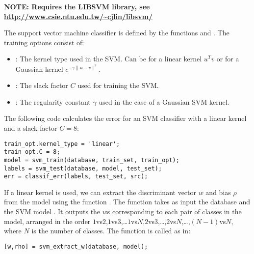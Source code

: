 \documentclass[twocolumn]{article}
\begin{document}
\textbf{NOTE: Requires the LIBSVM library, see \url{http://www.csie.ntu.edu.tw/~cjlin/libsvm/}}

The support vector machine classifier is defined by the functions  and . The training options consist of:
\begin{itemize}
	\item {}: The kernel type used in the SVM. Can be  for a linear kernel $u^Tv$ or  for a Gaussian kernel $e^{-\gamma\|u-v\|^2}$.
	\item {}: The slack factor $C$ used for training the SVM.
	\item {}: The regularity constant $\gamma$ used in the case of a Gaussian SVM kernel.
\end{itemize}

The following code calculates the error for an SVM classifier with a linear kernel and a slack factor $C = 8$:
\begin{lstlisting}
train_opt.kernel_type = 'linear';
train_opt.C = 8;
model = svm_train(database, train_set, train_opt);
labels = svm_test(database, model, test_set);
err = classif_err(labels, test_set, src);
\end{lstlisting}

If a linear kernel is used, we can extract the discriminant vector $w$ and bias $\rho$ from the model using the function . The function takes as input the database  and the SVM model . It outputs the $w$s corresponding to each pair of classes in the model, arranged in the order $1$vs$2$,$1$vs$3$,\ldots$1$vs$N$,$2$vs$3$,\ldots,$2$vs$N$,\ldots,$(N-1)$vs$N$, where $N$ is the number of classes. The function is called as in:
\begin{lstlisting}
[w,rho] = svm_extract_w(database, model);
\end{lstlisting}
\end{document}
